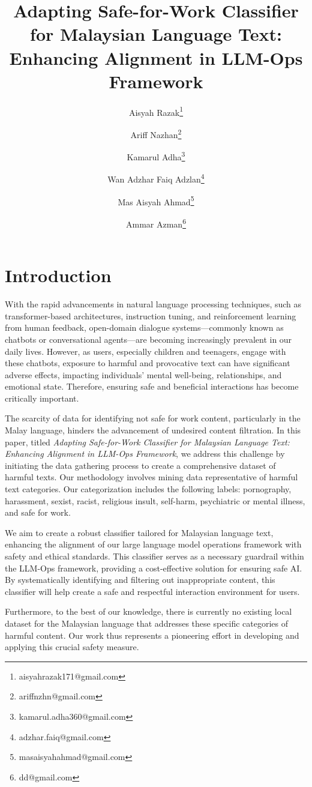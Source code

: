 \documentclass[preprint]{article}
\title{Adapting Safe-for-Work Classifier for Malaysian Language Text: Enhancing Alignment in LLM-Ops Framework}
\author{
  Aisyah Razak\thanks{aisyahrazak171@gmail.com} \and
  Ariff Nazhan\thanks{ariffnzhn@gmail.com} \and
  Kamarul Adha\thanks{kamarul.adha360@gmail.com} \and
  Wan Adzhar Faiq Adzlan\thanks{adzhar.faiq@gmail.com} \and
  Mas Aisyah Ahmad\thanks{masaisyahahmad@gmail.com} \and
  Ammar Azman\thanks{dd@gmail.com} \and
}
\begin{document}
\maketitle

\begin{abstract}

\end{abstract}

\section{Introduction}

With the rapid advancements in natural language processing techniques, such as transformer-based architectures, instruction tuning, and reinforcement learning from human feedback, open-domain dialogue systems—commonly known as chatbots or conversational agents—are becoming increasingly prevalent in our daily lives. However, as users, especially children and teenagers, engage with these chatbots, exposure to harmful and provocative text can have significant adverse effects, impacting individuals' mental well-being, relationships, and emotional state. Therefore, ensuring safe and beneficial interactions has become critically important.

The scarcity of data for identifying not safe for work content, particularly in the Malay language, hinders the advancement of undesired content filtration. In this paper, titled \textit{Adapting Safe-for-Work Classifier for Malaysian Language Text: Enhancing Alignment in LLM-Ops Framework}, we address this challenge by initiating the data gathering process to create a comprehensive dataset of harmful texts. Our methodology involves mining data representative of harmful text categories. Our categorization includes the following labels: pornography, harassment, sexist, racist, religious insult, self-harm, psychiatric or mental illness, and safe for work.

We aim to create a robust classifier tailored for Malaysian language text, enhancing the alignment of our large language model operations framework with safety and ethical standards. This classifier serves as a necessary guardrail within the LLM-Ops framework, providing a cost-effective solution for ensuring safe AI. By systematically identifying and filtering out inappropriate content, this classifier will help create a safe and respectful interaction environment for users.

Furthermore, to the best of our knowledge, there is currently no existing local dataset for the Malaysian language that addresses these specific categories of harmful content. Our work thus represents a pioneering effort in developing and applying this crucial safety measure.
\end{document}
